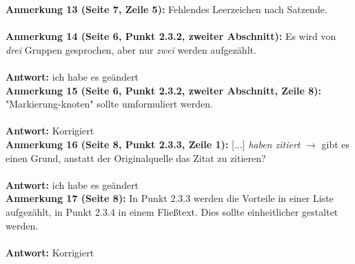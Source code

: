 \documentclass[a4paper,12pt]{book}
\begin{document}
\noindent
\textbf{Anmerkung 13 (Seite 7, Zeile 5):}
Fehlendes Leerzeichen nach Satzende. \\
\\

\noindent
\textbf{Anmerkung 14 (Seite 6, Punkt 2.3.2, zweiter Abschnitt):}
Es wird von \emph{drei} Gruppen gesprochen, aber nur \emph{zwei} werden aufgezählt.
 \\ \\
\textbf{Antwort:} ich habe es geändert
\\

\noindent
\textbf{Anmerkung 15 (Seite 6, Punkt 2.3.2, zweiter Abschnitt, Zeile 8):}
"Markierung-knoten" sollte umformuliert werden. 
\\ \\
\textbf{Antwort:} Korrigiert
\\

\noindent
\textbf{Anmerkung 16 (Seite 8, Punkt 2.3.3, Zeile 1):}
[...] \emph{haben zitiert} $\rightarrow$ gibt es einen Grund, anstatt der Originalquelle das Zitat zu zitieren? 
 \\ \\
\textbf{Antwort:} ich habe es geändert
\\

\noindent
\textbf{Anmerkung 17 (Seite 8):}
In Punkt 2.3.3 werden die Vorteile in einer Liste aufgezählt, in Punkt 2.3.4 in einem Fließtext. Dies sollte einheitlicher gestaltet werden. 
\\ \\
\textbf{Antwort:} Korrigiert
\\
\end{document}
